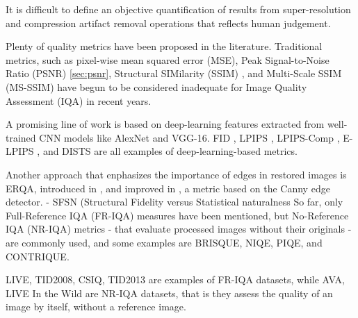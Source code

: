 \label{chap:metrics}





It is difficult to define an objective quantification of results from super-resolution and compression artifact removal operations that reflects human judgement.

Plenty of quality metrics have been proposed in the literature.
Traditional metrics, such as pixel-wise mean squared error (MSE), Peak Signal-to-Noise Ratio (PSNR) \ref{sec:psnr}, Structural SIMilarity (SSIM) \cite{wang2004image}, and Multi-Scale SSIM (MS-SSIM) \cite{wang2003multiscale} have begun to be considered inadequate for Image Quality Assessment (IQA) in recent years.

A promising line of work is based on deep-learning features extracted from well-trained CNN models like AlexNet and VGG-16.
FID \cite{heusel2017gans}, LPIPS \cite{zhang2018unreasonable}, LPIPS-Comp \cite{patel2021saliency}, E-LPIPS \cite{kettunen2019lpips}, and DISTS \cite{ding2020image} are all examples of deep-learning-based metrics.

Another approach that enphasizes the importance of edges in restored images is ERQA, introduced in \cite{kirillova2021erqa}, and improved in \cite{lyapustin2022towards}, a metric based on the Canny edge detector.
- SFSN (Structural Fidelity versus Statistical naturalness \cite{zhou2021image}
So far, only Full-Reference IQA (FR-IQA) measures have been mentioned, but No-Reference IQA (NR-IQA) metrics - that evaluate processed images without their originals - are commonly used, and some examples are BRISQUE, NIQE, PIQE, and CONTRIQUE.


LIVE, TID2008, CSIQ, TID2013 are examples of FR-IQA datasets, while AVA, LIVE In the Wild are NR-IQA datasets, that is they assess the quality of an image by itself, without a reference image.

